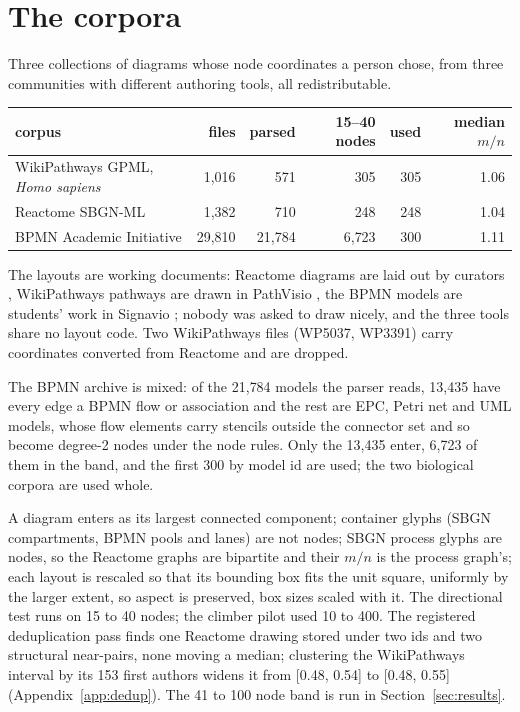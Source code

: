 \documentclass[a4paper,UKenglish]{gd-lipics-v3}
\begin{document}
\section{The corpora}\label{sec:corpora}

Three collections of diagrams whose node coordinates a person chose, from three communities
with different authoring tools, all redistributable.

\begin{center}\footnotesize
\begin{tabular}{lrrrrr}
\toprule
corpus & files & parsed & 15--40 nodes & used & median $m/n$ \\
\midrule
WikiPathways GPML, \emph{Homo sapiens} & 1{,}016 & 571 & 305 & 305 & 1.06 \\
Reactome SBGN-ML & 1{,}382 & 710 & 248 & 248 & 1.04 \\
BPMN Academic Initiative & 29{,}810 & 21{,}784 & 6{,}723 & 300 & 1.11 \\
\bottomrule
\end{tabular}
\end{center}

The layouts are working documents: Reactome diagrams are laid out by curators
\cite{fabregat18}, WikiPathways pathways are drawn in PathVisio \cite{agrawal24}, the
BPMN models are students' work in Signavio \cite{kunze11, sola23}; nobody was asked to
draw nicely, and the three tools share no layout code. Two
WikiPathways files (WP5037, WP3391) carry coordinates converted from Reactome
\cite{bohler16} and are dropped.

The BPMN archive is mixed: of the 21{,}784 models the parser reads, 13{,}435 have every
edge a BPMN flow or association and the rest are EPC, Petri net and UML models, whose flow
elements carry stencils outside the connector set and so become degree-2 nodes under the
node rules. Only the 13{,}435 enter, 6{,}723 of them in the band, and the first 300 by
model id are used; the two biological corpora are used whole.

A diagram enters as its largest connected component; container glyphs (SBGN compartments, BPMN pools and
lanes) are not nodes; SBGN process glyphs are nodes, so the Reactome graphs are bipartite
and their $m/n$ is the process graph's; each layout is rescaled so that its bounding box
fits the unit square, uniformly by the larger extent, so aspect is preserved, box sizes
scaled with it. The directional test runs on 15 to 40
nodes; the climber pilot used 10 to 400. The registered deduplication pass finds one Reactome drawing stored under two ids
and two structural near-pairs, none moving a median; clustering the WikiPathways
interval by its 153 first authors widens it from [0.48, 0.54] to [0.48, 0.55]
(Appendix~\ref{app:dedup}). The 41 to 100 node band is run in Section~\ref{sec:results}.
\end{document}
